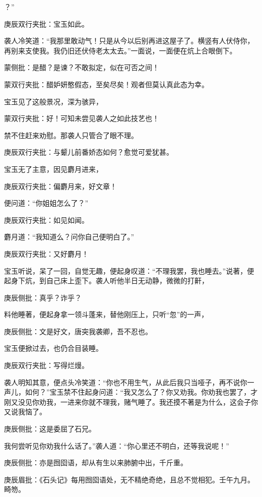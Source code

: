 \begin{parag}
？”\begin{note}庚辰双行夹批：宝玉如此。\end{note}袭人冷笑道：“我那里敢动气！只是从今以后别再进这屋子了。横竖有人伏侍你，再别来支使我。我仍旧还伏侍老太太去。”一面说，一面便在炕上合眼倒下。\begin{note}蒙侧批：是醋？是谏？不敢拟定，似在可否之间！\end{note}\begin{note}蒙双行夹批：醋妒妍憨假态，至矣尽矣！观者但莫认真此态为幸。\end{note}宝玉见了这般景况，深为骇异，\begin{note}蒙双行夹批：好！可知未尝见袭人之如此技艺也！\end{note}禁不住赶来劝慰。那袭人只管合了眼不理。\begin{note}庚辰双行夹批：与颦儿前番娇态如何？愈觉可爱犹甚。\end{note}宝玉无了主意，因见麝月进来，\begin{note}庚辰双行夹批：偏麝月来，好文章！\end{note}便问道：“你姐姐怎么了？”\begin{note}庚辰双行夹批：如见如闻。\end{note}麝月道：“我知道么？问你自己便明白了。”\begin{note}庚辰双行夹批：又好麝月！\end{note}宝玉听说，呆了一回，自觉无趣，便起身叹道：“不理我罢，我也睡去。”说著，便起身下炕，到自己床上歪下。袭人听他半日无动静，微微的打鼾，\begin{note}庚辰侧批：真乎？诈乎？\end{note}料他睡著，便起身拿一领斗蓬来，替他刚压上，只听“忽”的一声，\begin{note}庚辰侧批：文是好文，唐突我袭卿，吾不忍也。\end{note}宝玉便掀过去，也仍合目装睡。\begin{note}庚辰双行夹批：写得烂熳。\end{note}袭人明知其意，便点头冷笑道：“你也不用生气，从此后我只当哑子，再不说你一声儿，如何？”宝玉禁不住起身问道：“我又怎么了？你又劝我。你劝我也罢了，才刚又没见你劝我，一进来你就不理我，赌气睡了。我还摸不著是为什么，这会子你又说我恼了。\begin{note}庚辰侧批：这是委屈了石兄。\end{note}我何尝听见你劝我什么话了。”袭人道：“你心里还不明白，还等我说呢！”\begin{note}庚辰侧批：亦是囫囵语，却从有生以来肺腑中出，千斤重。\end{note}\begin{note}庚辰眉批：《石头记》每用囫囵语处，无不精绝奇绝，且总不觉相犯。壬午九月。畸笏。\end{note}
\end{parag}


